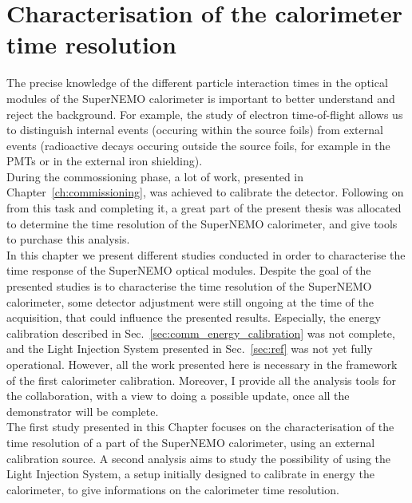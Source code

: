 \chapter{Characterisation of the calorimeter time resolution}

The precise knowledge of the different particle interaction times in the optical modules of the SuperNEMO calorimeter is important to better understand and reject the background.
For example, the study of electron time-of-flight allows us to distinguish internal events (occuring within the source foils) from external events (radioactive decays occuring outside the source foils, for example in the PMTs or in the external iron shielding).\\
\newline
During the commossioning phase, a lot of work, presented in Chapter~\ref{ch:commissioning}, was achieved to calibrate the detector.
Following on from this task and completing it, a great part of the present thesis was allocated to determine the time resolution of the SuperNEMO calorimeter, and give tools to purchase this analysis.\\
\newline
In this chapter we present different studies conducted in order to characterise the time response of the SuperNEMO optical modules.
Despite the goal of the presented studies is to characterise the time resolution of the SuperNEMO calorimeter, some detector adjustment were still ongoing at the time of the acquisition, that could influence the presented results.
Especially, the energy calibration described in Sec.~\ref{sec:comm_energy_calibration} was not complete, and the Light Injection System presented in Sec.~\ref{sec:ref} was not yet fully operational.
However, all the work presented here is necessary in the framework of the first calorimeter calibration.
Moreover, I provide all the analysis tools for the collaboration, with a view to doing a possible update, once all the demonstrator will be complete.\\
\newline
The first study presented in this Chapter focuses on the characterisation of the time resolution of a part of the SuperNEMO calorimeter, using an external calibration source.
A second analysis aims to study the possibility of using the Light Injection System, a setup initially designed to calibrate in energy the calorimeter, to give informations on the calorimeter time resolution.


